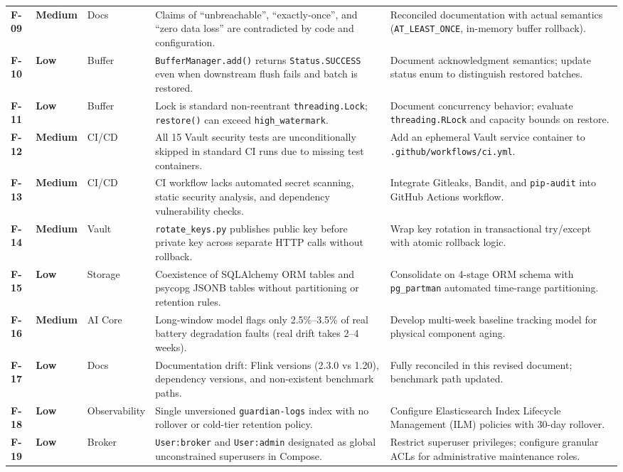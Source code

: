 \documentclass[10pt,a4paper]{report}
\begin{document}
\begin{table}[htbp]
\begin{tabularx}{\textwidth}{llp{1.8cm}Xp{3.5cm}}
\textbf{F-09} & \textbf{Medium} & Docs & Claims of ``unbreachable'', ``exactly-once'', and ``zero data loss'' are contradicted by code and configuration. & Reconciled documentation with actual semantics (\texttt{AT\_LEAST\_ONCE}, in-memory buffer rollback). \\
\textbf{F-10} & \textbf{Low} & Buffer & \lstinline{BufferManager.add()} returns \lstinline{Status.SUCCESS} even when downstream flush fails and batch is restored. & Document acknowledgment semantics; update status enum to distinguish restored batches. \\
\textbf{F-11} & \textbf{Low} & Buffer & Lock is standard non-reentrant \lstinline{threading.Lock}; \lstinline{restore()} can exceed \lstinline{high_watermark}. & Document concurrency behavior; evaluate \lstinline{threading.RLock} and capacity bounds on restore. \\
\textbf{F-12} & \textbf{Medium} & CI/CD & All 15 Vault security tests are unconditionally skipped in standard CI runs due to missing test containers. & Add an ephemeral Vault service container to \texttt{.github/workflows/ci.yml}. \\
\textbf{F-13} & \textbf{Medium} & CI/CD & CI workflow lacks automated secret scanning, static security analysis, and dependency vulnerability checks. & Integrate Gitleaks, Bandit, and \texttt{pip-audit} into GitHub Actions workflow. \\
\textbf{F-14} & \textbf{Medium} & Vault & \texttt{rotate\_keys.py} publishes public key before private key across separate HTTP calls without rollback. & Wrap key rotation in transactional try/except with atomic rollback logic. \\
\textbf{F-15} & \textbf{Low} & Storage & Coexistence of SQLAlchemy ORM tables and psycopg JSONB tables without partitioning or retention rules. & Consolidate on 4-stage ORM schema with \texttt{pg\_partman} automated time-range partitioning. \\
\textbf{F-16} & \textbf{Medium} & AI Core & Long-window model flags only 2.5\%--3.5\% of real battery degradation faults (real drift takes 2--4 weeks). & Develop multi-week baseline tracking model for physical component aging. \\
\textbf{F-17} & \textbf{Low} & Docs & Documentation drift: Flink versions (2.3.0 vs 1.20), dependency versions, and non-existent benchmark paths. & Fully reconciled in this revised document; benchmark path updated. \\
\textbf{F-18} & \textbf{Low} & Observability & Single unversioned \texttt{guardian-logs} index with no rollover or cold-tier retention policy. & Configure Elasticsearch Index Lifecycle Management (ILM) policies with 30-day rollover. \\
\textbf{F-19} & \textbf{Low} & Broker & \texttt{User:broker} and \texttt{User:admin} designated as global unconstrained superusers in Compose. & Restrict superuser privileges; configure granular ACLs for administrative maintenance roles. \\
\bottomrule
\end{tabularx}
\end{table}
\end{document}
